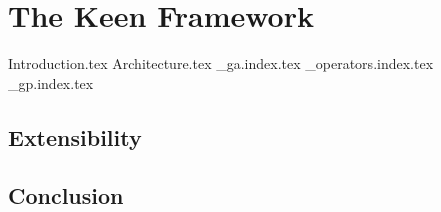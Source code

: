 
\chapter{The Keen Framework}
\label{chap:keen}
  {Introduction.tex}
  {Architecture.tex}
  {_ga.index.tex}
  {_operators.index.tex}
  {_gp.index.tex}
  
  \section{Extensibility}
  \label{sec:extensibility}
    \Blindtext
  \section{Conclusion}
  \label{sec:conclusion}
    \Blindtext
